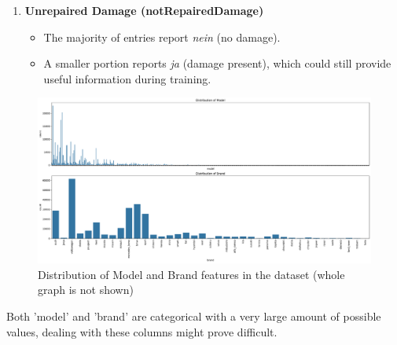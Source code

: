\documentclass[conference]{IEEEtran}
\begin{document}
\begin{enumerate}
    \item \textbf{Unrepaired Damage (notRepairedDamage)}
    \begin{itemize}
        \item The majority of entries report \textit{nein} (no damage).
        \item A smaller portion reports \textit{ja} (damage present), which
                could still provide useful information during training.
    \end{itemize}
\end{enumerate}

\begin{figure}[H]
\centering
\includegraphics[trim=0 0 10cm 0, clip, width=\linewidth]{figures/model_brand_distribution.pdf}
\caption{Distribution of Model and Brand features in the dataset (whole graph
is not shown)}
\label{fig:model_brand_dist}
\end{figure}

Both 'model' and 'brand' are categorical with a very large amount of possible
values, dealing with these columns might prove difficult.
\end{document}
